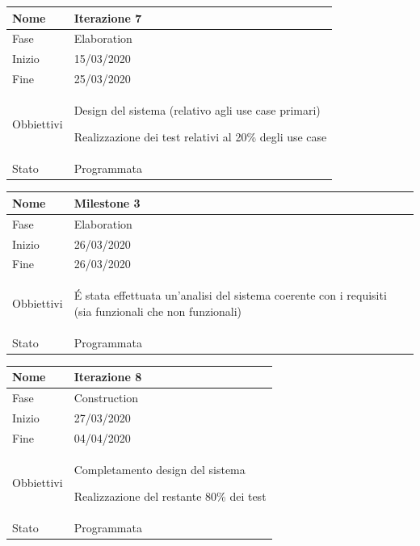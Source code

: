 \begin{center}
\begin{tabular}{ |p{2cm}|p{10cm}|  }
\hline
Nome & Iterazione 7 \\\hline
Fase & Elaboration \\\hline
Inizio & 15/03/2020 \\\hline
Fine & 25/03/2020 \\\hline
Obbiettivi & 
	\begin{compactitem}
		\item Design del sistema (relativo agli use case primari)
		\item Realizzazione dei test relativi al 20\% degli use case
	\end{compactitem}\\\hline
Stato &  Programmata \\\hline
\end{tabular}
\label{table:7}\newline

\begin{tabular}{ |p{2cm}|p{10cm}|  }
\hline
Nome & Milestone 3\\\hline
Fase & Elaboration \\\hline
Inizio & 26/03/2020 \\\hline
Fine &  26/03/2020 \\\hline
Obbiettivi & 
	\begin{compactitem}
		\item \'E stata effettuata un'analisi del sistema coerente con i requisiti (sia funzionali che non funzionali)
	\end{compactitem}\\\hline
Stato &  Programmata \\\hline
\end{tabular}
\label{table:milestone3}\newline

\begin{tabular}{ |p{2cm}|p{10cm}|  }
\hline
Nome & Iterazione 8 \\\hline
Fase & Construction \\\hline
Inizio & 27/03/2020 \\\hline
Fine &  04/04/2020  \\\hline
Obbiettivi & 
	\begin{compactitem}
		\item Completamento design del sistema
		\item Realizzazione del restante 80\% dei test
	\end{compactitem}\\\hline
Stato &  Programmata \\\hline
\end{tabular}
\label{table:8}\newline


\end{center}
